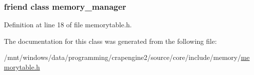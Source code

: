 \subsubsection[{memory\+\_\+manager}]{\setlength{\rightskip}{0pt plus 5cm}friend class {\bf memory\+\_\+manager}\hspace{0.3cm}{\ttfamily [friend]}}\label{classcrap_1_1memory__table_a242c93ac6853d673bc3e068a57510842}


Definition at line 18 of file memorytable.\+h.



The documentation for this class was generated from the following file\+:\begin{DoxyCompactItemize}
\item 
/mnt/windows/data/programming/crapengine2/source/core/include/memory/\hyperlink{memorytable_8h}{memorytable.\+h}\end{DoxyCompactItemize}
